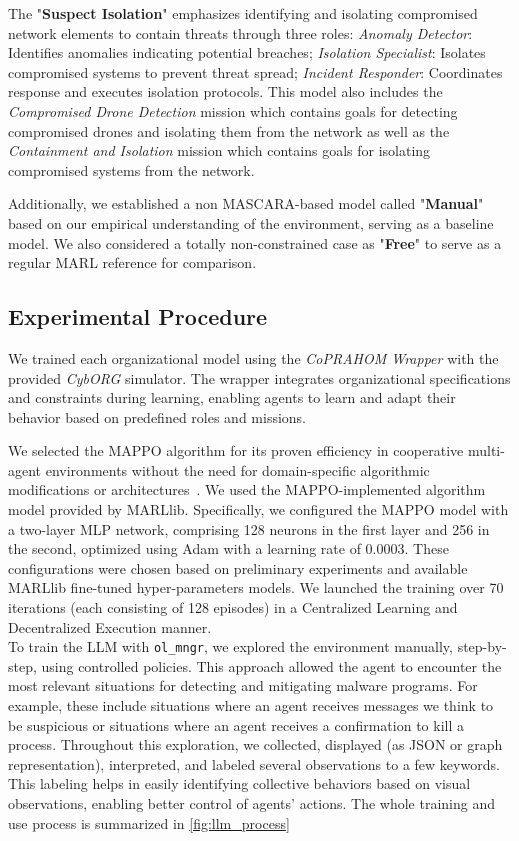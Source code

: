 The "\textbf{Suspect Isolation}" emphasizes identifying and isolating compromised network elements to contain threats through three roles:
%
\textit{Anomaly Detector}: Identifies anomalies indicating potential breaches;
\textit{Isolation Specialist}: Isolates compromised systems to prevent threat spread;
\textit{Incident Responder}: Coordinates response and executes isolation protocols.
%
This model also includes the \textit{Compromised Drone Detection} mission which contains goals for detecting compromised drones and isolating them from the network as well as the \textit{Containment and Isolation} mission which contains goals for isolating compromised systems from the network.

Additionally, we established a non MASCARA-based model called "\textbf{Manual}" based on our empirical understanding of the environment, serving as a baseline model.
We also considered a totally non-constrained case as "\textbf{Free}" to serve as a regular MARL reference for comparison.


\subsection{Experimental Procedure}

We trained each organizational model using the \textit{CoPRAHOM Wrapper} with the provided \textit{CybORG} simulator. The wrapper integrates organizational specifications and constraints during learning, enabling agents to learn and adapt their behavior based on predefined roles and missions.

We selected the MAPPO algorithm for its proven efficiency in cooperative multi-agent environments without the need for domain-specific algorithmic modifications or architectures~\cite{Yu2022}. We used the MAPPO-implemented algorithm model provided by MARLlib. Specifically, we configured the MAPPO model with a two-layer MLP network, comprising 128 neurons in the first layer and 256 in the second, optimized using Adam with a learning rate of 0.0003. These configurations were chosen based on preliminary experiments and available MARLlib fine-tuned hyper-parameters models. We launched the training over 70 iterations (each consisting of 128 episodes) in a Centralized Learning and Decentralized Execution manner.\\

To train the LLM with \texttt{ol\_mngr}, we explored the environment manually, step-by-step, using controlled policies. This approach allowed the agent to encounter the most relevant situations for detecting and mitigating malware programs. For example, these include situations where an agent receives messages we think to be suspicious or situations where an agent receives a confirmation to kill a process. Throughout this exploration, we collected, displayed (as JSON or graph representation), interpreted, and labeled several observations to a few keywords. This labeling helps in easily identifying collective behaviors based on visual observations, enabling better control of agents' actions. The whole training and use process is summarized in \autoref{fig:llm_process}

